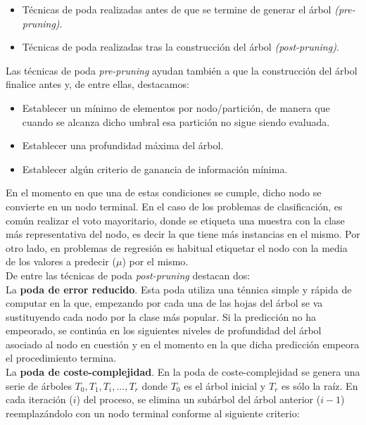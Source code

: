 \begin{itemize}
	\item Técnicas de poda realizadas antes de que se termine de generar el árbol \textit{(pre-pruning)}.
	\item Técnicas de poda realizadas tras la construcción del árbol \textit{(post-pruning)}.\\
\end{itemize}

Las técnicas de poda \textit{pre-pruning} ayudan también a que la construcción del árbol finalice antes y, de entre ellas, destacamos:\\

\begin{itemize}
	\item Establecer un mínimo de elementos por nodo/partición, de manera que cuando se alcanza dicho umbral esa partición no sigue siendo evaluada.
	\item Establecer una profundidad máxima del árbol.
	\item Establecer algún criterio de ganancia de información mínima.
\end{itemize}

En el momento en que una de estas condiciones se cumple, dicho nodo se convierte en un nodo terminal. En el caso de los problemas de clasificación, es común realizar el voto mayoritario, donde se etiqueta una muestra con la clase más representativa del nodo, es decir la que tiene más instancias en el mismo. Por otro lado, en problemas de regresión es habitual etiquetar el nodo con la media de los valores a predecir ($\mu$) por el mismo.\\

De entre las técnicas de poda \textit{post-pruning} destacan dos:\\

La \textbf{poda de error reducido}. Esta poda utiliza una ténnica simple y rápida de computar en la que, empezando por cada una de las hojas del árbol se va sustituyendo cada nodo por la clase más popular. Si la predicción no ha empeorado, se continúa en los siguientes niveles de profundidad del árbol asociado al nodo en cuestión y en el momento en la que dicha predicción empeora el procedimiento termina.\\

La \textbf{poda de coste-complejidad}. En la poda de coste-complejidad se genera una serie de árboles $T_0, T_1, T_i, ... , T_r$ donde $T_0$ es el árbol inicial y $T_r$ es sólo la raíz. En cada iteración ($i$) del proceso, se elimina un subárbol del árbol anterior ($i-1$) reemplazándolo con un nodo terminal conforme al siguiente criterio:

